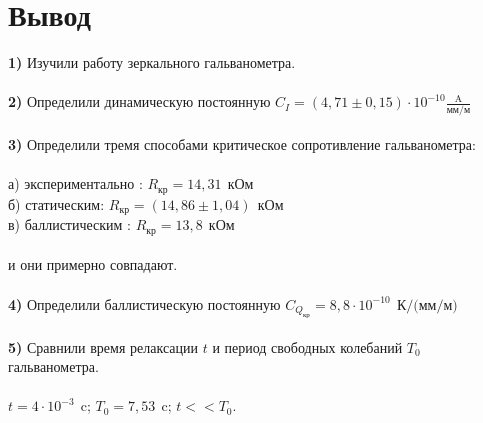\documentclass[11pt,a4paper]{article}
\begin{document}
\part*{Вывод}
\textbf{1)} Изучили работу зеркального гальванометра. \\\\
\textbf{2)} Определили динамическую постоянную $C_I = (4,71 \pm 0,15) \cdot 10^{-10} \frac{\text{A}}{\text{мм} / \text{м}}$ \\\\
\textbf{3)} Определили тремя способами критическое сопротивление гальванометра:\\\\
а) экспериментально : $R_{\text{кр}} = 14,31 \ \ \text{кОм}$ \\
б) статическим: $R_{\text{кр}} =  (14,86 \pm 1,04)\ \ \text{кОм}$ \\
в) баллистическим : $R_{\text{кр}} =  13,8 \ \ \text{кОм}$ \\\\
и они примерно совпадают.\\\\
\textbf{4)} Определили баллистическую постоянную $C_{Q_{\text{кр}}} = 8,8 \cdot 10^{-10} \ \ \text{К/(мм/м)}$
\\\\
\textbf{5)} Сравнили время релаксации $t$ и период свободных колебаний $T_0$ гальванометра.\\\\
$t = 4\cdot 10^{-3} \ \ \text{c}$; $T_0 = 7,53 \ \ \text{c}$; $t << T_0$.
\end{document}
